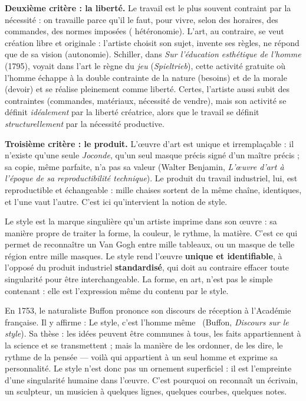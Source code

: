 \documentclass[11pt]{article}
\newcommand{\cle}[1]{{\popxbold\color{popdark}#1}}
\begin{document}
\textbf{Deuxième critère : la liberté.} Le travail est le plus souvent contraint par la \cle{nécessité} : on travaille parce qu'il le faut, pour vivre, selon des horaires, des commandes, des normes imposées ( hétéronomie). L'art, au contraire, se veut \cle{création libre et originale} : l'artiste choisit son sujet, invente ses règles, ne répond que de sa vision (autonomie). Schiller, dans \emph{Sur l'éducation esthétique de l'homme} (1795), voyait dans l'art le règne du \emph{jeu} (\emph{Spieltrieb}), cette activité gratuite où l'homme échappe à la double contrainte de la nature (besoins) et de la morale (devoir) et se réalise pleinement comme liberté. Certes, l'artiste aussi subit des contraintes (commandes, matériaux, nécessité de vendre), mais son activité se définit \emph{idéalement} par la liberté créatrice, alors que le travail se définit \emph{structurellement} par la nécessité productive.

\textbf{Troisième critère : le produit.} L'œuvre d'art est \cle{unique et irremplaçable} : il n'existe qu'une seule \emph{Joconde}, qu'un seul masque précis signé d'un maître précis ; sa copie, même parfaite, n'a pas sa valeur (Walter Benjamin, \emph{L'œuvre d'art à l'époque de sa reproductibilité technique}). Le produit du travail industriel, lui, est \cle{reproductible et échangeable} : mille chaises sortent de la même chaîne, identiques, et l'une vaut l'autre. C'est ici qu'intervient la notion de \cle{style}.

\begin{definition}[Le style]
Le \cle{style} est la marque singulière qu'un artiste imprime dans son œuvre : sa manière propre de traiter la forme, la couleur, le rythme, la matière. C'est ce qui permet de reconnaître un Van Gogh entre mille tableaux, ou un masque de telle région entre mille masques. Le style rend l'œuvre \textbf{unique et identifiable}, à l'opposé du produit industriel \textbf{standardisé}, qui doit au contraire effacer toute singularité pour être interchangeable. La \cle{forme}, en art, n'est pas le simple contenant : elle est l'expression même du contenu par le style.
\end{definition}

\begin{savaistu}
En 1753, le naturaliste Buffon prononce son discours de réception à l'Académie française. Il y affirme : \guillemotleft Le style, c'est l'homme même \guillemotright\ (Buffon, \emph{Discours sur le style}). Sa thèse : les idées peuvent être communes à tous, les faits appartiennent à la science et se transmettent ; mais la manière de les ordonner, de les dire, le rythme de la pensée — voilà qui appartient à un seul homme et exprime sa personnalité. Le style n'est donc pas un ornement superficiel : il est l'empreinte d'une singularité humaine dans l'œuvre. C'est pourquoi on reconnaît un écrivain, un sculpteur, un musicien à quelques lignes, quelques courbes, quelques notes.
\end{savaistu}
\end{document}
